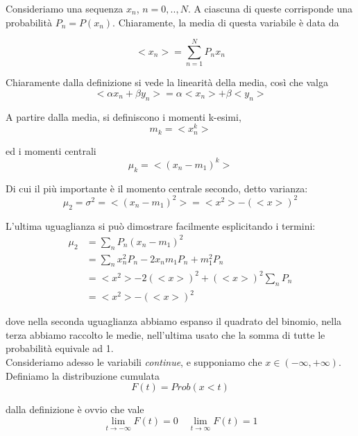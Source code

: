 \documentclass{report}
\begin{document}
Consideriamo una sequenza $x_n$, $n=0, .., N$. A ciascuna di queste corrisponde una probabilità $P_n=P(x_n)$. Chiaramente, la media di questa variabile è data da

\begin{equation}
    <x_n> = \sum_{n=1}^{N}P_nx_n
\end{equation}

Chiaramente dalla definizione si vede la linearità della media, così che valga 
\begin{equation}
    <\alpha x_n + \beta y_n> = \alpha<x_n> + \beta<y_n> 
\end{equation}

A partire dalla media, si definiscono i momenti k-esimi,
\begin{equation}
    m_k = <x_n^k>
\end{equation}

ed i momenti centrali 
\begin{equation}
    \mu_k = <(x_n - m_1)^k>
\end{equation}

Di cui il più importante è il momento centrale secondo, detto varianza: 
\begin{equation}
    \mu_2 = \sigma^2 = <(x_n - m_1)^2> = <x^2> - (<x>)^2
\end{equation}

L'ultima uguaglianza si può dimostrare facilmente esplicitando i termini: 
\begin{align}
    \mu_2 &= \sum_n P_n(x_n - m_1)^2 \\
    &= \sum_nx_n^2 P_n - 2x_nm_1P_n + m_1^2 P_n \\
    &= <x^2> - 2(<x>)^2 + (<x>)^2\sum_n P_n \\
    &= <x^2> - (<x>)^2
\end{align}

dove nella seconda uguaglianza abbiamo espanso il quadrato del binomio, nella terza abbiamo raccolto le medie, nell'ultima usato che la somma di tutte le probabilità equivale ad 1. \\

Consideriamo adesso le variabili \emph{continue}, e supponiamo che $x \in (-\infty, +\infty)$. Definiamo la distribuzione cumulata 
\begin{equation}
    F(t) = Prob(x<t)
\end{equation}

dalla definizione è ovvio che vale 
\begin{equation}
    \lim_{t \rightarrow -\infty}F(t) = 0 \quad \lim_{t \rightarrow \infty}F(t) = 1
\end{equation}
\end{document}
